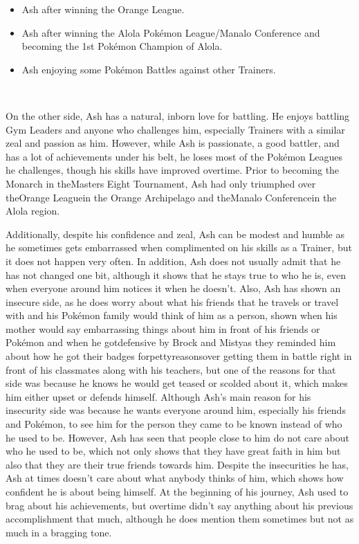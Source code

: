 \documentclass[a4paper,12pt]{article}
\begin{document}
\begin{itemize}
\item Ash after winning the Orange League.
\item Ash after winning the Alola Pokémon League/Manalo Conference and becoming the 1st Pokémon Champion of Alola.
\item Ash enjoying some Pokémon Battles against other Trainers.
\end{itemize}\\ \par \vspace{0.5cm}

On the other side, Ash has a natural, inborn love for battling. He enjoys battling Gym Leaders and anyone who challenges him, especially Trainers with a similar zeal and passion as him. However, while Ash is passionate, a good battler, and has a lot of achievements under his belt, he loses most of the Pokémon Leagues he challenges, though his skills have improved overtime. Prior to becoming the Monarch in theMasters Eight Tournament, Ash had only triumphed over theOrange Leaguein the Orange Archipelago and theManalo Conferencein the Alola region.\\ \par \vspace{0.5cm}

Additionally, despite his confidence and zeal, Ash can be modest and humble as he sometimes gets embarrassed when complimented on his skills as a Trainer, but it does not happen very often. In addition, Ash does not usually admit that he has not changed one bit, although it shows that he stays true to who he is, even when everyone around him notices it when he doesn't. Also, Ash has shown an insecure side, as he does worry about what his friends that he travels or travel with and his Pokémon family would think of him as a person, shown when his mother would say embarrassing things about him in front of his friends or Pokémon and when he gotdefensive by Brock and Mistyas they reminded him about how he got their badges forpettyreasonsover getting them in battle right in front of his classmates along with his teachers, but one of the reasons for that side was because he knows he would get teased or scolded about it, which makes him either upset or defends himself. Although Ash's main reason for his insecurity side was because he wants everyone around him, especially his friends and Pokémon, to see him for the person they came to be known instead of who he used to be. However, Ash has seen that people close to him do not care about who he used to be, which not only shows that they have great faith in him but also that they are their true friends towards him. Despite the insecurities he has, Ash at times doesn't care about what anybody thinks of him, which shows how confident he is about being himself. At the beginning of his journey, Ash used to brag about his achievements, but overtime didn't say anything about his previous accomplishment that much, although he does mention them sometimes but not as much in a bragging tone.\\ \par \vspace{0.5cm}
\end{document}
